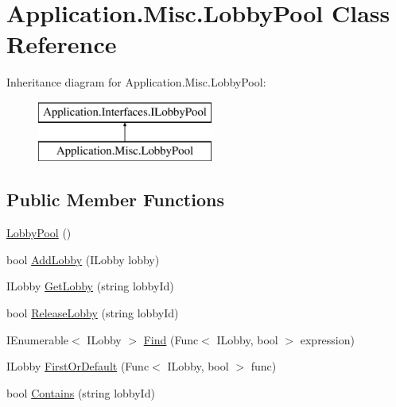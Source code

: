 \hypertarget{class_application_1_1_misc_1_1_lobby_pool}{}\section{Application.\+Misc.\+Lobby\+Pool Class Reference}
\label{class_application_1_1_misc_1_1_lobby_pool}
Inheritance diagram for Application.\+Misc.\+Lobby\+Pool\+:\begin{figure}[H]
\begin{center}
\leavevmode
\includegraphics[height=2.000000cm]{class_application_1_1_misc_1_1_lobby_pool}
\end{center}
\end{figure}
\subsection*{Public Member Functions}
\begin{DoxyCompactItemize}
\item 
\mbox{\hyperlink{class_application_1_1_misc_1_1_lobby_pool_adefb9ad44d5c53d09f31a79ff5a96e89}{Lobby\+Pool}} ()
\item 
bool \mbox{\hyperlink{class_application_1_1_misc_1_1_lobby_pool_a442eb666b16bc75025732413f38b0846}{Add\+Lobby}} (I\+Lobby lobby)
\item 
I\+Lobby \mbox{\hyperlink{class_application_1_1_misc_1_1_lobby_pool_a61b2a303bd4bc1e72e31b3ee3d1e06d5}{Get\+Lobby}} (string lobby\+Id)
\item 
bool \mbox{\hyperlink{class_application_1_1_misc_1_1_lobby_pool_a747cfa417f8932fa8b006b6662c45099}{Release\+Lobby}} (string lobby\+Id)
\item 
I\+Enumerable$<$ I\+Lobby $>$ \mbox{\hyperlink{class_application_1_1_misc_1_1_lobby_pool_a3d1c9e496386713ad5d8ede307e6c28c}{Find}} (Func$<$ I\+Lobby, bool $>$ expression)
\item 
I\+Lobby \mbox{\hyperlink{class_application_1_1_misc_1_1_lobby_pool_a5676f006bc10c46224c1b3bb266702a3}{First\+Or\+Default}} (Func$<$ I\+Lobby, bool $>$ func)
\item 
bool \mbox{\hyperlink{class_application_1_1_misc_1_1_lobby_pool_af9f3a5b65c1a948fa63796a907c1684d}{Contains}} (string lobby\+Id)
\end{DoxyCompactItemize}
